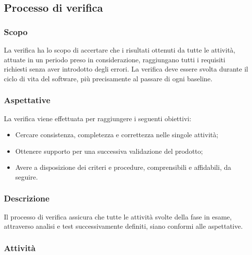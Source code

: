 \subsection{Processo di verifica}
\subsubsection{Scopo}
La verifica ha lo scopo di accertare che i risultati ottenuti da tutte le attività, attuate in un periodo preso in considerazione, raggiungano tutti i requisiti richiesti senza aver introdotto degli errori. La verifica deve essere svolta durante il ciclo di vita del software, più precisamente al passare di ogni baseline\glo.
\subsubsection{Aspettative}
La verifica viene effettuata per raggiungere i seguenti obiettivi:
\begin{itemize}
	\item Cercare consistenza, completezza e correttezza nelle singole attività;
	\item Ottenere supporto per una successiva validazione del prodotto;
	\item Avere a disposizione dei criteri e procedure, comprensibili e affidabili, da seguire.
\end{itemize}
\subsubsection{Descrizione}
Il processo di verifica assicura che tutte le attività svolte della fase in esame, attraverso analisi e test successivamente definiti, siano conformi alle aspettative.
\subsubsection{Attività}
